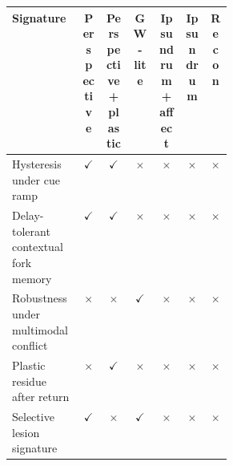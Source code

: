 \begin{tabular}{p{0.32\linewidth}cccccc}
\toprule
Signature & Perspective & Perspective+plastic & GW-lite & Ipsundrum+affect & Ipsundrum & Recon \\
\midrule
Hysteresis under cue ramp & \ensuremath{\checkmark} & \ensuremath{\checkmark} & \ensuremath{\times} & \ensuremath{\times} & \ensuremath{\times} & \ensuremath{\times} \\
Delay-tolerant contextual fork memory & \ensuremath{\checkmark} & \ensuremath{\checkmark} & \ensuremath{\times} & \ensuremath{\times} & \ensuremath{\times} & \ensuremath{\times} \\
Robustness under multimodal conflict & \ensuremath{\times} & \ensuremath{\times} & \ensuremath{\checkmark} & \ensuremath{\times} & \ensuremath{\times} & \ensuremath{\times} \\
Plastic residue after return & \ensuremath{\times} & \ensuremath{\checkmark} & \ensuremath{\times} & \ensuremath{\times} & \ensuremath{\times} & \ensuremath{\times} \\
Selective lesion signature & \ensuremath{\checkmark} & \ensuremath{\times} & \ensuremath{\checkmark} & \ensuremath{\times} & \ensuremath{\times} & \ensuremath{\times} \\
\bottomrule
\end{tabular}